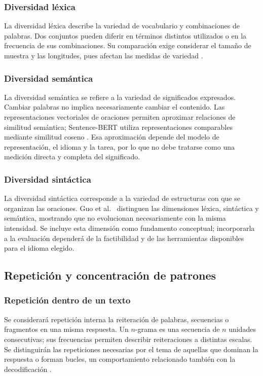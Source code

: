 \documentclass[12pt,letterpaper]{article}
\begin{document}
\subsubsection{Diversidad léxica}

La diversidad léxica describe la variedad de vocabulario y combinaciones
de palabras. Dos conjuntos pueden diferir en términos distintos utilizados
o en la frecuencia de sus combinaciones. Su comparación exige considerar
el tamaño de muestra y las longitudes, pues afectan las medidas de variedad
\cite{guo2024}.

\subsubsection{Diversidad semántica}

La diversidad semántica se refiere a la variedad de significados expresados.
Cambiar palabras no implica necesariamente cambiar el contenido. Las
representaciones vectoriales de oraciones permiten aproximar relaciones
de similitud semántica; Sentence-BERT utiliza representaciones comparables
mediante similitud coseno \cite{reimers2019}. Esa aproximación depende del
modelo de representación, el idioma y la tarea, por lo que no debe tratarse
como una medición directa y completa del significado.

\subsubsection{Diversidad sintáctica}

La diversidad sintáctica corresponde a la variedad de estructuras con que
se organizan las oraciones. Guo et al.\ \cite{guo2024} distinguen las
dimensiones léxica, sintáctica y semántica, mostrando que no evolucionan
necesariamente con la misma intensidad. Se incluye esta dimensión como
fundamento conceptual; incorporarla a la evaluación dependerá de la
factibilidad y de las herramientas disponibles para el idioma elegido.

\subsection{Repetición y concentración de patrones}

\subsubsection{Repetición dentro de un texto}

Se considerará repetición interna la reiteración de palabras, secuencias
o fragmentos en una misma respuesta. Un \(n\)-grama es una secuencia de
\(n\) unidades consecutivas; sus frecuencias permiten describir
reiteraciones a distintas escalas. Se distinguirán las repeticiones
necesarias por el tema de aquellas que dominan la respuesta o forman
bucles, un comportamiento relacionado también con la decodificación
\cite{holtzman2020}.
\end{document}
